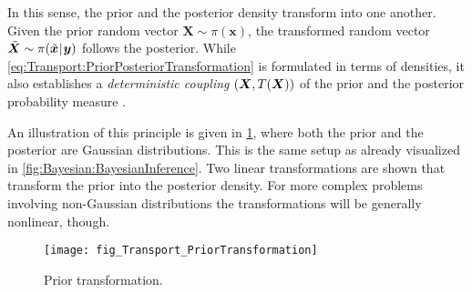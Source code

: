 In this sense, the prior and the posterior density transform into one another.
Given the prior random vector \(\bm{X} \sim \pi(\bm{x})\), the transformed random vector \(\tilde{\bm{X}} \sim \pi(\tilde{\bm{x}} {\:\!}|{\:\!} \bm{y})\) follows the posterior.
While \cref{eq:Transport:PriorPosteriorTransformation} is formulated in terms of densities, it also establishes a \emph{deterministic coupling}
\((\bm{X},T(\bm{X}))\) of the prior and the posterior probability measure \cite{Probability:Thorisson2000,Probability:Lindvall2002}.
\par %
An illustration of this principle is given in \cref{fig:Transport:PriorTransformation}, where both the prior and the posterior are Gaussian distributions.
This is the same setup as already visualized in \cref{fig:Bayesian:BayesianInference}.
Two linear transformations are shown that transform the prior into the posterior density.
For more complex problems involving non-Gaussian distributions the transformations will be generally nonlinear, though.
\begin{figure}[htbp]
  \centering
  \texttt{[image: fig\_Transport\_PriorTransformation]}
  \caption[Prior transformation]{Prior transformation.}
  \label{fig:Transport:PriorTransformation}
\end{figure}

